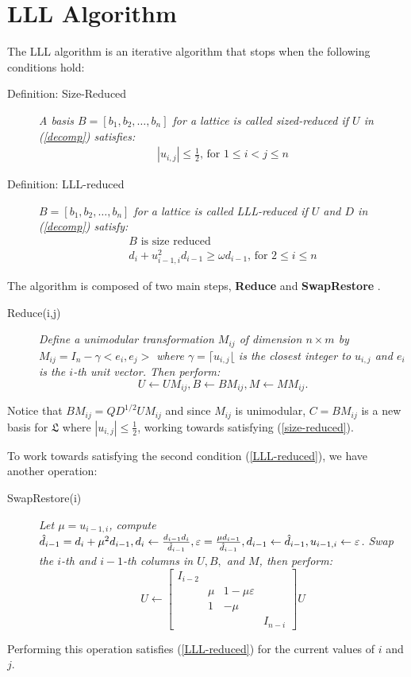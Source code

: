 \documentclass[12pt]{article}
\numberwithin{equation}{section}
\numberwithin{table}{section}
\numberwithin{figure}{section}
\begin{document}
\section{LLL Algorithm}
The LLL algorithm is an iterative algorithm that stops when the following conditions hold:
\begin{description}
\item[Definition: Size-Reduced]\textit{ A basis $B=[b_1,b_2,\ldots,b_n]$ for a lattice is called sized-reduced if $U$ in (\ref{decomp}) satisfies\cite{OriginalLLL}:}
\begin{eqnarray}
|u_{i,j}|\leq\frac{1}{2}\text{, for }1\leq i < j \leq n \label{size-reduced}
\end{eqnarray}
\item[Definition: LLL-reduced] \textit{$B=[b_1,b_2,\ldots,b_n]$ for a lattice is called LLL-reduced if $U$ and $D$ in (\ref{decomp}) satisfy:}
\begin{eqnarray}
B\text{ is size reduced}\\
d_i+u^2_{i-1,i}d_{i-1}\geq \omega d_{i-1}\text{, for }2 \leq i \leq n \label{LLL-reduced}
\end{eqnarray}
\end{description}
The algorithm is composed of two main steps, \textbf{Reduce} and \textbf{SwapRestore} \cite{OriginalLLL}.
\begin{description}
\item[Reduce(i,j)] \textit{Define a unimodular transformation $M_{ij}$ of dimension $n\times m$ by 
\\$M_{ij}=I_n-\gamma <e_i, e_j>$ where $\gamma=\lceil u_{i,j} \lfloor$ is the closest integer to $u_{i,j}$ and $e_i$ is the $i$-th unit vector. Then perform:}
$$U\leftarrow UM_{ij}, B\leftarrow BM_{ij}, M\leftarrow MM_{ij}.$$
\end{description}
Notice that $BM_{ij}=QD^{1/2}UM_{ij}$ and since $M_{ij}$ is unimodular, $C=BM_{ij}$ is a new basis for $\mathfrak{L}$ where $|u_{i,j}|\leq \frac{1}{2}$, working towards satisfying (\ref{size-reduced}).

To work towards satisfying the second condition (\ref{LLL-reduced}), we have another operation:
\begin{description}
\item[SwapRestore(i)] \textit{Let $\mu=u_{i-1,i}$, compute $\hat{d}_{i-1}=d_i+\mu^2 d_{i-1}, d_i\leftarrow \frac{d_{i-1}d_i}{\hat{d}_{i-1}},
\\\varepsilon=\frac{\mu d_{i-1}}{\hat{d}_{i-1}},d_{i-1}\leftarrow \hat{d}_{i-1}, u_{i-1,i}\leftarrow \varepsilon$. Swap the $i$-th and $i-1$-th columns in $U,B,$ and $M$, then perform:}
$$U \leftarrow \left[
\begin{array}{cccc}
I_{i-2} & & &\\
&\mu & 1-\mu \varepsilon &\\
&1   &  -\mu &\\
& & & I_{n-i}
\end{array}\right]U $$
\end{description}
Performing this operation satisfies (\ref{LLL-reduced}) for the current values of $i$ and $j$.
\end{document}
